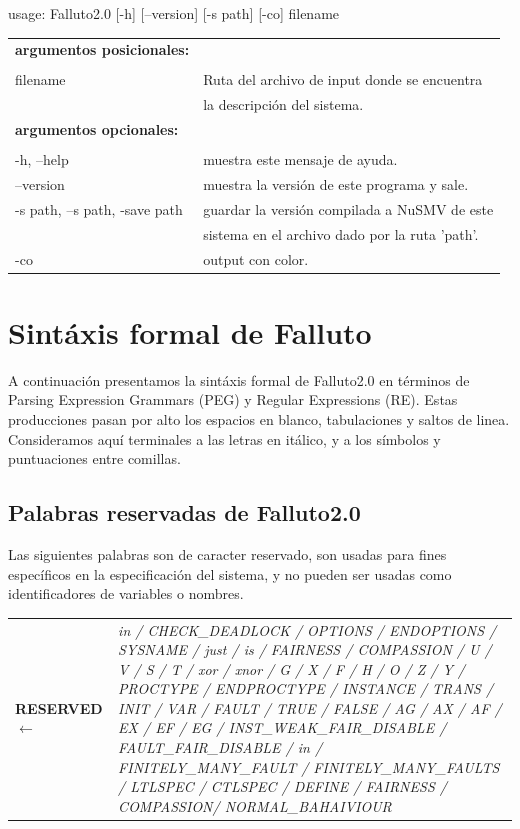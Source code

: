 \documentclass[titlepage, 12pt]{book}
\begin{document}
\noindent usage: Falluto2.0 [-h] [--version] [-s path] [-co] filename\\


\begin{tabular}{ll}
\textbf{argumentos posicionales:}\\\\
filename & Ruta del archivo de input donde se encuentra \\
         & la descripción del sistema.\\
\textbf{argumentos opcionales:} & \\\\
-h, --help          & muestra este mensaje de ayuda.\\
--version           & muestra la versión de este programa y sale.\\
-s path, --s path, -save path & guardar la versión compilada a NuSMV de este \\
                              & sistema en el archivo dado por la ruta 'path'.\\
-co 		        & output con color.\\
\end{tabular}



\chapter{Sint\'axis formal de Falluto}
\label{sintaxisFormal}

A continuaci\'on presentamos la sint\'axis formal de Falluto2.0 en t\'erminos de Parsing Expression Grammars (PEG) y Regular Expressions (RE). Estas producciones pasan por alto los espacios en blanco, tabulaciones y saltos de linea. Consideramos aqu\'i terminales a las letras en it\'alico, y a los s\'imbolos y puntuaciones entre comillas.

\section{Palabras reservadas de Falluto2.0}

Las siguientes palabras son de caracter reservado, son usadas para fines específicos en la especificación del sistema, y no pueden ser usadas como identificadores de variables o nombres.\\

\begin{tabularx}{\textwidth}{>{\bfseries}l>{\itshape}X }

RESERVED $\longleftarrow$ & in / CHECK\_DEADLOCK / OPTIONS / ENDOPTIONS / SYSNAME / just / is / FAIRNESS / COMPASSION / U / V / S / T / xor / xnor / G / X / F / H / O / Z / Y / PROCTYPE / ENDPROCTYPE / INSTANCE / TRANS / INIT / VAR / FAULT / TRUE / FALSE / AG / AX / AF / EX / EF / EG / INST\_WEAK\_FAIR\_DISABLE / FAULT\_FAIR\_DISABLE / in / FINITELY\_MANY\_FAULT / FINITELY\_MANY\_FAULTS / LTLSPEC / CTLSPEC / DEFINE / FAIRNESS / COMPASSION/ NORMAL\_BAHAIVIOUR\\
\end{tabularx}
~\\
\end{document}
